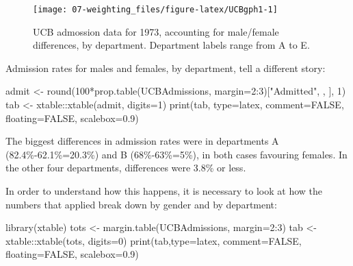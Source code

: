 \documentclass[
  10pt,
  b5paper]{book}
\newenvironment{Shaded}{\begin{snugshade}}{\end{snugshade}}
\newcommand{\AttributeTok}[1]{\textcolor[rgb]{0.77,0.63,0.00}{#1}}
\newcommand{\ConstantTok}[1]{\textcolor[rgb]{0.00,0.00,0.00}{#1}}
\newcommand{\DecValTok}[1]{\textcolor[rgb]{0.00,0.00,0.81}{#1}}
\newcommand{\FloatTok}[1]{\textcolor[rgb]{0.00,0.00,0.81}{#1}}
\newcommand{\FunctionTok}[1]{\textcolor[rgb]{0.00,0.00,0.00}{#1}}
\newcommand{\NormalTok}[1]{#1}
\newcommand{\OtherTok}[1]{\textcolor[rgb]{0.56,0.35,0.01}{#1}}
\newcommand{\SpecialCharTok}[1]{\textcolor[rgb]{0.00,0.00,0.00}{#1}}
\newcommand{\StringTok}[1]{\textcolor[rgb]{0.31,0.60,0.02}{#1}}
\begin{document}
\begin{figure}[H]
\texttt{[image: 07-weighting\_files/figure-latex/UCBgph1-1]} \caption{UCB admossion data for 1973, accounting for male/female differences, by department.  Department labels range from A to E.}\label{fig:UCBgph1}
\end{figure}

Admission rates for males and females, by department, tell a different
story:

\begin{Shaded}
\begin{Highlighting}[]
\NormalTok{admit }\OtherTok{\textless{}{-}} \FunctionTok{round}\NormalTok{(}\DecValTok{100}\SpecialCharTok{*}\FunctionTok{prop.table}\NormalTok{(UCBAdmissions,}
                     \AttributeTok{margin=}\DecValTok{2}\SpecialCharTok{:}\DecValTok{3}\NormalTok{)[}\StringTok{"Admitted"}\NormalTok{, , ], }\DecValTok{1}\NormalTok{)}
\NormalTok{tab }\OtherTok{\textless{}{-}}\NormalTok{ xtable}\SpecialCharTok{::}\FunctionTok{xtable}\NormalTok{(admit, }\AttributeTok{digits=}\DecValTok{1}\NormalTok{)}
\FunctionTok{print}\NormalTok{(tab, }\AttributeTok{type=}\StringTok{\textquotesingle{}latex\textquotesingle{}}\NormalTok{, }\AttributeTok{comment=}\ConstantTok{FALSE}\NormalTok{, }\AttributeTok{floating=}\ConstantTok{FALSE}\NormalTok{, }\AttributeTok{scalebox=}\FloatTok{0.9}\NormalTok{)}
\end{Highlighting}
\end{Shaded}


The biggest differences in admission rates were in departments
A (82.4\%-62.1\%=20.3\%) and B (68\%-63\%=5\%), in both cases favouring females.
In the other four departments, differences were 3.8\% or less.

In order to understand how this happens, it is necessary to look
at how the numbers that applied break down by gender and by department:

\begin{Shaded}
\begin{Highlighting}[]
\FunctionTok{library}\NormalTok{(xtable)}
\NormalTok{tots }\OtherTok{\textless{}{-}} \FunctionTok{margin.table}\NormalTok{(UCBAdmissions, }\AttributeTok{margin=}\DecValTok{2}\SpecialCharTok{:}\DecValTok{3}\NormalTok{)}
\NormalTok{tab }\OtherTok{\textless{}{-}}\NormalTok{ xtable}\SpecialCharTok{::}\FunctionTok{xtable}\NormalTok{(tots, }\AttributeTok{digits=}\DecValTok{0}\NormalTok{)}
\FunctionTok{print}\NormalTok{(tab,}\AttributeTok{type=}\StringTok{\textquotesingle{}latex\textquotesingle{}}\NormalTok{, }\AttributeTok{comment=}\ConstantTok{FALSE}\NormalTok{, }\AttributeTok{floating=}\ConstantTok{FALSE}\NormalTok{, }\AttributeTok{scalebox=}\FloatTok{0.9}\NormalTok{)}
\end{Highlighting}
\end{Shaded}
\end{document}

